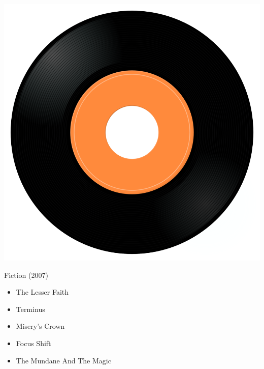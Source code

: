 \begin{minipage}[t]{0.25\textwidth}\vspace{0pt}
\captionsetup{type=figure}
\includegraphics[width=\textwidth]{Images/cover.png}
\caption*{Fiction (2007)}
\end{minipage}
\begin{minipage}[t]{0.25\textwidth}\vspace{0pt}
\begin{itemize}[nosep,leftmargin=1em,labelwidth=*,align=left]
	\setlength{\itemsep}{0pt}
	\item The Lesser Faith
	\item Terminus
	\item Misery's Crown
	\item Focus Shift
	\item The Mundane And The Magic
\end{itemize}
\end{minipage}
